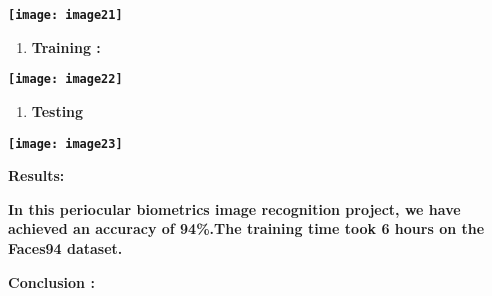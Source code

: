\documentclass{article} %
\begin{document}
\noindent \textbf{}

\noindent \textbf{\texttt{[image: image21]}}

\noindent \textbf{}

\begin{enumerate}
\item \textbf{ Training  :}
\end{enumerate}

\noindent \textbf{}

\noindent \textbf{\texttt{[image: image22]}}

\noindent \textbf{}

\noindent \textbf{}

\noindent \textbf{}

\begin{enumerate}
\item \textbf{ Testing }
\end{enumerate}

\noindent \textbf{}

\noindent \textbf{\texttt{[image: image23]}}

\noindent \textbf{}

\noindent \textbf{}

\noindent \textbf{}

\noindent \textbf{}

\noindent \textbf{Results:}

\noindent \textbf{}

\noindent \textbf{                             In this periocular biometrics image recognition project, we have achieved an accuracy of 94\%.The training time took 6 hours on the Faces94 dataset.}

\noindent \textbf{}

\noindent \textbf{}

\noindent \textbf{}

\noindent \textbf{}

\noindent \textbf{}

\noindent \textbf{}

\noindent \textbf{}

\noindent \textbf{}

\noindent \textbf{ }

\noindent \textbf{}

\noindent \textbf{ Conclusion :}

\noindent 
\end{document}
